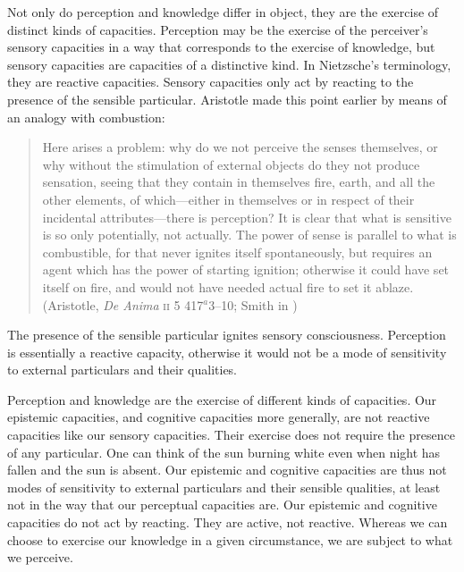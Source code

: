 Not only do perception and knowledge differ in object, they are the exercise of distinct kinds of capacities. Perception may be the exercise of the perceiver's sensory capacities in a way that corresponds to the exercise of knowledge, but sensory capacities are capacities of a distinctive kind. In Nietzsche's \citeyearpar{Nietzsche1887On-the-Genealog} terminology, they are reactive capacities. Sensory capacities only act by reacting to the presence of the sensible particular. Aristotle made this point earlier by means of an analogy with combustion:
\begin{quote}
	Here arises a problem: why do we not perceive the senses themselves, or why without the stimulation of external objects do they not produce sensation, seeing that they contain in themselves fire, earth, and all the other elements, of which—either in themselves or in respect of their incidental attributes—there is perception? It is clear that what is sensitive is so only potentially, not actually. The power of sense is parallel to what is combustible, for that never ignites itself spontaneously, but requires an agent which has the power of starting ignition; otherwise it could have set itself on fire, and would not have needed actual fire to set it ablaze. (Aristotle, \emph{De Anima} \textsc{ii} 5 417\( ^{a} \)3--10; Smith in \citealt[29]{Barnes:1984uq})
\end{quote}
The presence of the sensible particular ignites sensory consciousness. Perception is essentially a reactive capacity, otherwise it would not be a mode of sensitivity to external particulars and their qualities.

Perception and knowledge are the exercise of different kinds of capacities. Our epistemic capacities, and cognitive capacities more generally, are not reactive capacities like our sensory capacities. Their exercise does not require the presence of any particular. One can think of the sun burning white even when night has fallen and the sun is absent. Our epistemic and cognitive capacities are thus not modes of sensitivity to external particulars and their sensible qualities, at least not in the way that our perceptual capacities are. Our epistemic and cognitive capacities do not act by reacting. They are active, not reactive. Whereas we can choose to exercise our knowledge in a given circumstance, we are subject to what we perceive.

